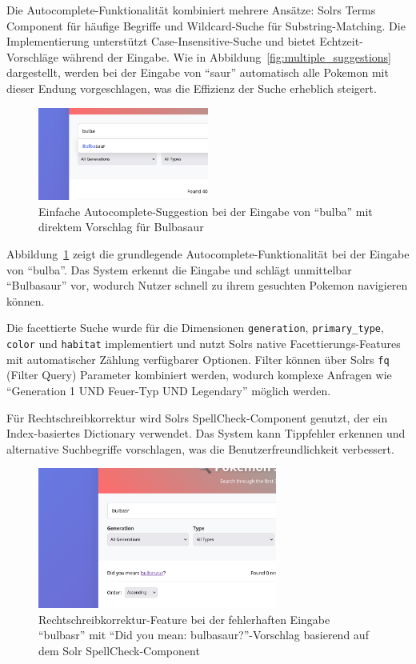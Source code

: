 Die Autocomplete-Funktionalität kombiniert mehrere Ansätze: Solrs Terms Component für häufige Begriffe und Wildcard-Suche für Substring-Matching. Die Implementierung unterstützt Case-Insensitive-Suche und bietet Echtzeit-Vorschläge während der Eingabe. Wie in Abbildung~\ref{fig:multiple_suggestions} dargestellt, werden bei der Eingabe von "`saur"' automatisch alle Pokemon mit dieser Endung vorgeschlagen, was die Effizienz der Suche erheblich steigert.

\begin{figure}[htbp]
    \centering
    \includegraphics[width=0.5\textwidth]{figures/screenshot_search_suggestion.png}
    \caption{Einfache Autocomplete-Suggestion bei der Eingabe von "`bulba"' mit direktem Vorschlag für Bulbasaur}
    \label{fig:simple_autocomplete}
\end{figure}

Abbildung~\ref{fig:simple_autocomplete} zeigt die grundlegende Autocomplete-Funktionalität bei der Eingabe von "`bulba"'. Das System erkennt die Eingabe und schlägt unmittelbar "`Bulbasaur"' vor, wodurch Nutzer schnell zu ihrem gesuchten Pokemon navigieren können.

Die facettierte Suche wurde für die Dimensionen \texttt{generation}, \texttt{primary\_type}, \texttt{color} und \texttt{habitat} implementiert und nutzt Solrs native Facettierungs-Features mit automatischer Zählung verfügbarer Optionen. Filter können über Solrs \texttt{fq} (Filter Query) Parameter kombiniert werden, wodurch komplexe Anfragen wie "`Generation 1 UND Feuer-Typ UND Legendary"' möglich werden.

Für Rechtschreibkorrektur wird Solrs SpellCheck-Component genutzt, der ein Index-basiertes Dictionary verwendet. Das System kann Tippfehler erkennen und alternative Suchbegriffe vorschlagen, was die Benutzerfreundlichkeit verbessert.

\begin{figure}[htbp]
    \centering
    \includegraphics[width=0.7\textwidth]{figures/Screenshot_search_did_you_mean.png}
    \caption{Rechtschreibkorrektur-Feature bei der fehlerhaften Eingabe "`bulbasr"' mit "`Did you mean: bulbasaur?"'-Vorschlag basierend auf dem Solr SpellCheck-Component}
    \label{fig:spellcheck}
\end{figure}

